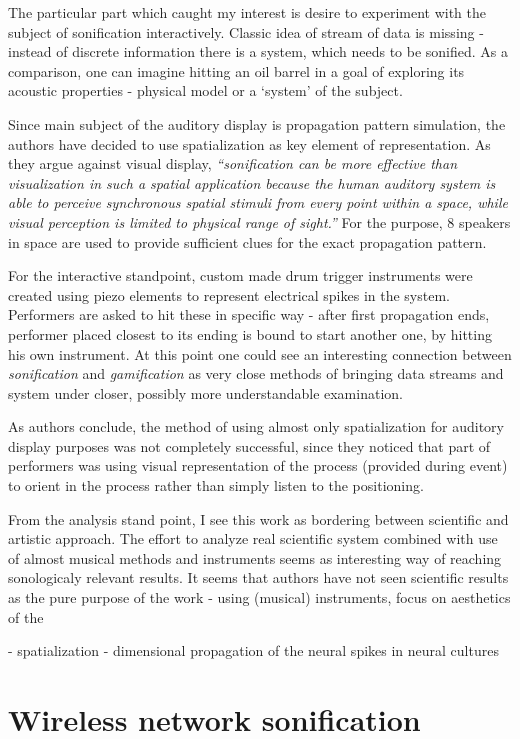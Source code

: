 \documentclass[11pt,a4paper,oneside]{report}
\begin{document}
The particular part which caught my interest is desire to experiment with the subject of sonification interactively. Classic idea of stream of data is missing - instead of discrete information there is a system, which needs to be sonified. As a comparison, one can imagine hitting an oil barrel in a goal of exploring its acoustic properties - physical model or a `system' of the subject.

Since main subject of the auditory display is propagation pattern simulation, the authors have decided to use spatialization as key element of representation. As they argue against visual display, \emph{``sonification can be more effective than visualization in such a spatial application because the human auditory system is able to perceive synchronous spatial stimuli from every point within a space, while visual perception is limited to physical range of sight.''} For the purpose, 8 speakers in space are used to provide sufficient clues for the exact propagation pattern.

For the interactive standpoint, custom made drum trigger instruments were created using piezo elements to represent electrical spikes in the system. Performers are asked to hit these in specific way - after first propagation ends, performer placed closest to its ending is bound to start another one, by hitting his own instrument. At this point one could see an interesting connection between \emph{sonification} and \emph{gamification} as very close methods of bringing data streams and system under closer, possibly more understandable examination.

As authors conclude, the method of using almost only spatialization for auditory display purposes was not completely successful, since they noticed that part of performers was using visual representation of the process (provided during event) to orient in the process rather than simply listen to the positioning. 

From the analysis stand point, I see this work as bordering between scientific and artistic approach. The effort to analyze real scientific system combined with use of almost musical methods and instruments seems as interesting way of reaching sonologicaly relevant results. It seems that authors have not seen scientific results as the pure purpose of the work - using (musical) instruments, focus on aesthetics of the 

- spatialization - dimensional propagation of the neural spikes in neural cultures

\section{Wireless network sonification}
\end{document}
